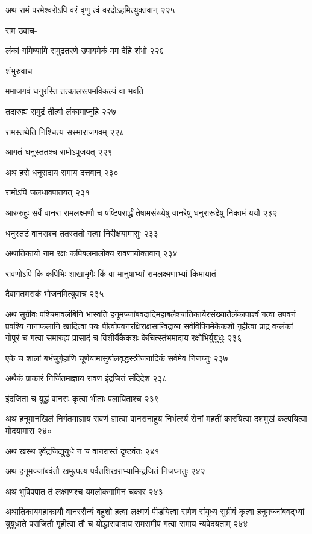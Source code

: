 अथ रामं परमेश्वरोऽपि वरं वृणु त्वं वरदोऽहमित्युक्तवान् २२५

राम उवाच-

लंकां गमिष्यामि समुद्रतरणे उपायमेकं मम देहि शंभो २२६

शंभुरुवाच-

ममाजगवं धनुरस्ति तत्कालरूपमविकल्पं वा भवति

तदारुह्य समुद्रं तीर्त्वा लंकामाप्नुहि २२७

रामस्तथेति निश्चित्य सस्माराजगवम् २२८

आगतं धनुस्ततश्च रामोऽपूजयत् २२९

अथ हरो धनुरादाय रामाय दत्तवान् २३०

रामोऽपि जलधावपातयत् २३१

आरुरुहुः सर्वे वानरा रामलक्ष्मणौ च षष्टिपरार्द्धं तेषामसंख्येषु वानरेषु धनुरारूढेषु निकामं ययौ
२३२

धनुस्तटं वानराश्च ततस्ततो गत्वा निरीक्षयामासुः २३३

अथातिकायो नाम रक्षः कपिबलमालोक्य रावणायोक्तवान् २३४

रावणोऽपि किं कपिभिः शाखामृगैः किं वा मानुषाभ्यां रामलक्ष्मणाभ्यां किमायातं

दैवागतमसकं भोजनमित्युवाच २३५

अथ सुग्रीवः पश्चिमावलंबिनि भास्वति हनूमज्जांबवदादिमहाबलैश्चातिकायैरसंख्यातैर्लंकापार्श्वं
गत्वा उपवनं प्रवश्यि नानाफलानि खादित्वा पयः पीत्वोपवनरक्षिराक्षसान्विद्राव्य
सर्वविपिनमेकैकशो गृहीत्वा प्राद्र वन्लंकां गोपुरं च गत्वा समारुह्य प्रासादं च विशीर्यैकैकशः
केचित्स्तंभमादाय रक्षोभिर्युयुधुः २३६

एके च शालां बभंजुर्गृहाणि चूर्णयामासुर्बालवृद्धस्त्रीजनादिकं सर्वमेव निजघ्नुः २३७

अथैकं प्राकारं निर्जितमाज्ञाय रावण इंद्रजितं संदिदेश २३८

इंद्रजिता च युद्धं वानराः कृत्वा भीताः पलायिताश्च २३९

अथ हनूमानखिलं निर्गतमाज्ञाय रावणं ज्ञात्वा वानरानाहूय निर्भर्त्स्य सेनां महतीं कारयित्वा
दशमुखं कल्पयित्वा मोदयामास २४०

अथ खस्थ एवेंद्रजिद्युयुधे न च वानरास्तं दृष्टवंतः २४१

अथ हनूमज्जांबवंतौ खमुत्पत्य पर्वतशिखराभ्यामिन्द्रजितं निजघ्नतुः २४२

अथ भुविपपात तं लक्ष्मणश्च यमलोकगामिनं चकार २४३

अथातिकायमहाकायौ वानरसैन्यं बहुशो हत्वा लक्ष्मणं पीडयित्वा रामेण संयुध्य सुग्रीवं कृत्वा
हनूमज्जांबवद्भ्यां युयुधाते पराजितौ गृहीत्वा तौ च योद्धारावादाय रामसमीपं गत्वा रामाय
न्यवेदयताम् २४४

